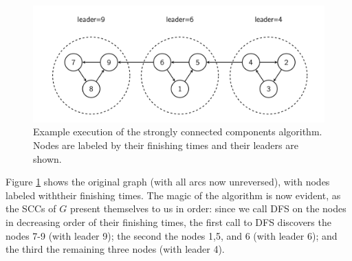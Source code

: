 \documentclass [12pt]{article}
\theoremstyle{definition}
\begin{document}
\begin{figure}[ht!]
\includegraphics[scale=0.8]{scc_alg.png}
\caption{Example execution of the strongly connected components algorithm. Nodes are labeled by their finishing times and their leaders are shown.}
\label{fig:scc_alg}
\end{figure}

Figure \ref{fig:scc_alg} shows the original graph (with all arcs now unreversed), with nodes labeled withtheir finishing times. The magic of the algorithm is now evident, as the SCCs of $G$ present themselves to us in order: since we call DFS on the nodes in decreasing order of their finishing times, the first call to DFS discovers the nodes 7-9 (with leader 9); the second the nodes 1,5, and 6 (with leader 6); and the third the remaining three nodes (with leader 4).
\end{document}
